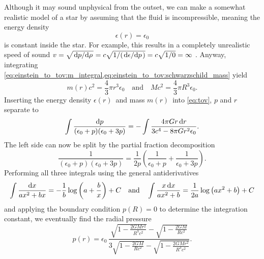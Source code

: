 Although it may sound unphysical from the outset, we can make a somewhat realistic model of a star by assuming that the fluid is incompressible, meaning the energy density
\begin{equation}
	\epsilon(r) = \epsilon_0
\end{equation}
is constant inside the star.
For example, this results in a completely unrealistic speed of sound $v = \sqrt{\odv{p}/{\rho}} = c \sqrt{1/(\odv{\epsilon}/{p})} = c \sqrt{1/0} = \infty$ \cite{ref:speed_of_sound}.
Anyway, integrating \cref{eq:einstein_to_tov:m_integral,eq:einstein_to_tov:schwarzschild_mass} yield
\begin{equation}
	m(r) c^2 = \frac{4}{3} \pi r^3 \epsilon_0 
	\quad \text{and} \quad
	M c^2 = \frac{4}{3} \pi R^3 \epsilon_0 
	.
\end{equation}
Inserting the energy density $\epsilon(r)$ and mass $m(r)$ into \cref{eq:tov}, $p$ and $r$ separate to
\begin{equation*}
	\int \frac{\mathop{}\!\mathrm{d} p}{(\epsilon_0+p)(\epsilon_0+3p)} = - \int \frac{4 \pi G r \mathop{}\!\mathrm{d} r}{3 c^4 - 8\pi G r^2 \epsilon_0} .
\end{equation*}
The left side can now be split by the partial fraction decomposition
\begin{equation*}
	\frac{1}{(\epsilon_0+p)(\epsilon_0+3p)} = \frac{1}{2p} \left( \frac{1}{\epsilon_0+p} + \frac{1}{\epsilon_0+3p} \right) .
\end{equation*}
Performing all three integrals using the general antiderivatives
\begin{equation*}
	\int \frac{\mathop{}\!\mathrm{d} x}{a x^2 + b x} = -\frac{1}{b} \log \left( a + \frac{b}{x} \right) + C
	\quad \text{and} \quad
	\int \frac{x \mathop{}\!\mathrm{d} x}{a x^2 + b} = \frac{1}{2 a} \log \left( a x^2 + b \right) + C
\end{equation*}
and applying the boundary condition $p(R) = 0$ to determine the integration constant, we eventually find the radial pressure
\begin{equation}
	p(r) = \epsilon_0 \, \frac{\sqrt{1-\frac{2GMr^2}{R^3c^2}} - \sqrt{1-\frac{2GM}{Rc^2}}}{3 \sqrt{1-\frac{2GM}{Rc^2}} - \sqrt{1-\frac{2GMr^2}{R^3c^2}}} .
	\label{eq:incompressible_star:pressure}
\end{equation}
